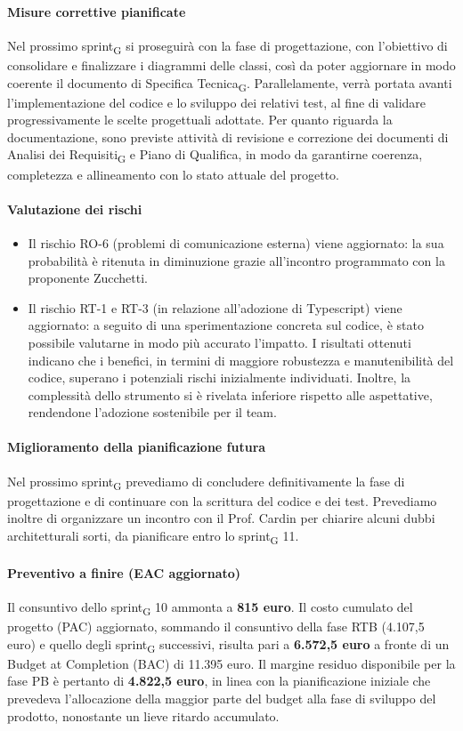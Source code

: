 \documentclass[11pt,a4paper]{article}
\newcommand{\gls}[1]{#1\textsubscript{G}}
\begin{document}
\paragraph{Misure correttive pianificate}
Nel prossimo \gls{sprint} si proseguirà con la fase di progettazione, con l’obiettivo di consolidare e finalizzare i diagrammi delle classi, così da poter aggiornare in modo coerente il documento di \gls{Specifica Tecnica}. Parallelamente, verrà portata avanti l’implementazione del codice e lo sviluppo dei relativi test, al fine di validare progressivamente le scelte progettuali adottate.
Per quanto riguarda la documentazione, sono previste attività di revisione e correzione dei documenti di \gls{Analisi dei Requisiti} e Piano di Qualifica, in modo da garantirne coerenza, completezza e allineamento con lo stato attuale del progetto.

\paragraph{Valutazione dei rischi}
\begin{itemize}
\item Il rischio RO-6 (problemi di comunicazione esterna) viene aggiornato: la sua probabilità è ritenuta in diminuzione grazie all’incontro programmato con la proponente Zucchetti.
\item Il rischio RT-1 e RT-3 (in relazione all'adozione di Typescript) viene aggiornato: a seguito di una sperimentazione concreta sul codice, è stato possibile valutarne in modo più accurato l’impatto. I risultati ottenuti indicano che i benefici, in termini di maggiore robustezza e manutenibilità del codice, superano i potenziali rischi inizialmente individuati. Inoltre, la complessità dello strumento si è rivelata inferiore rispetto alle aspettative, rendendone l’adozione sostenibile per il team.
\end{itemize}
 
\paragraph{Miglioramento della pianificazione futura}
Nel prossimo \gls{sprint} prevediamo di concludere definitivamente la fase di progettazione e di continuare con la scrittura del codice e dei test. Prevediamo inoltre di organizzare un incontro con il Prof. Cardin per chiarire alcuni dubbi architetturali sorti, da pianificare entro lo \gls{sprint} 11.
 
\paragraph{Preventivo a finire (EAC aggiornato)}
Il consuntivo dello \gls{sprint} 10 ammonta a \textbf{815 euro}.
Il costo cumulato del progetto (PAC) aggiornato, sommando il consuntivo della fase RTB (4.107,5 euro) e quello degli \gls{sprint} successivi, risulta pari a \textbf{6.572,5 euro} a fronte di un Budget at Completion (BAC) di 11.395 euro.
Il margine residuo disponibile per la fase PB è pertanto di \textbf{4.822,5 euro}, in linea con la pianificazione iniziale che prevedeva l’allocazione della maggior parte del budget alla fase di sviluppo del prodotto, nonostante un lieve ritardo accumulato.
\newpage
\end{document}
